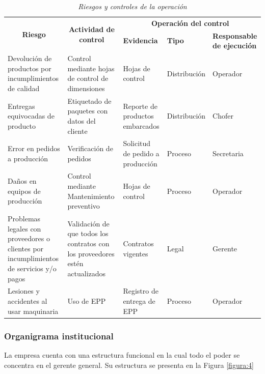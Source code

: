 \documentclass[12pt, a4paper]{article}
\begin{document}
\begin{table}[H]
\centering
\caption{\textit{{Riesgos y controles de la operación}}}
\label{tabla:3}
\begin{tabular}{|p{3cm}|p{3.5cm}|p{2cm}|p{2.5cm}|p{2.5cm}|}
\hline
\multicolumn{1}{|c|}{\multirow{2}{3cm}{\textbf{Riesgo}}} & \multicolumn{1}{c|}{\multirow{2}{3.5cm}{\textbf{Actividad de control}}} & \multicolumn{3}{c|}{\textbf{Operación del control}} \\ \cline{3-5} 
\multicolumn{1}{|c|}{} & \multicolumn{1}{c|}{} & \textbf{Evidencia} & \textbf{Tipo} & \textbf{Responsable de ejecución} \\ \hline
Devolución de productos por incumplimientos de calidad & Control mediante hojas de control de dimensiones & Hojas de control & Distribución & Operador \\ \hline
Entregas equivocadas de producto & Etiquetado de paquetes con datos del cliente & Reporte de productos embarcados & Distribución & Chofer \\ \hline
Error en pedidos a producción & Verificación de pedidos & Solicitud de pedido a producción & Proceso & Secretaria \\ \hline
Daños en equipos de producción & Control mediante Mantenimiento preventivo & Hojas de control & Proceso & Operador \\ \hline
Problemas legales con proveedores o clientes por incumplimientos de servicios y/o pagos & Validación de que todos los contratos con los proveedores estén actualizados & Contratos vigentes & Legal & Gerente \\ \hline
Lesiones y accidentes al usar maquinaria & Uso de EPP & Registro de entrega de EPP & Proceso & Operador \\ \hline
\end{tabular}
\end{table}

\subsubsection{Organigrama institucional}
La empresa cuenta con una estructura funcional en la cual todo el poder se concentra en el gerente general. Su estructura se presenta en la Figura \ref{figura:4}
\end{document}
